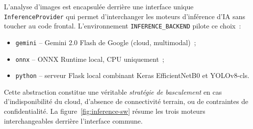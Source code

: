 L'analyse d'images est encapsulée derrière une interface unique
\texttt{InferenceProvider} qui permet d'interchanger les moteurs
d'inférence d'IA sans toucher au code frontal. L'environnement
\texttt{INFERENCE\_BACKEND} pilote ce choix~:

\begin{itemize}
  \item \texttt{gemini} -- Gemini 2.0 Flash de Google (cloud,
        multimodal)~;
  \item \texttt{onnx} -- ONNX Runtime local, CPU uniquement~;
  \item \texttt{python} -- serveur Flask local combinant Keras
        EfficientNetB0 et YOLOv8-cls.
\end{itemize}

Cette abstraction constitue une véritable \emph{stratégie de
basculement} en cas d'indisponibilité du cloud, d'absence de
connectivité terrain, ou de contraintes de confidentialité. La
figure~\ref{fig:inference-sw} résume les trois moteurs
interchangeables derrière l'interface commune.

